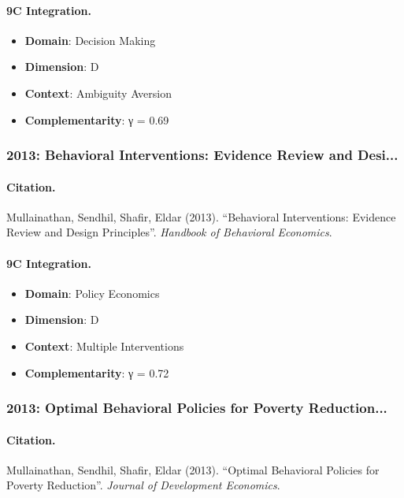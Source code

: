 \paragraph{9C Integration.}
\begin{itemize}[nosep]
  \item \textbf{Domain}: Decision Making
  \item \textbf{Dimension}: D
  \item \textbf{Context}: Ambiguity Aversion
  \item \textbf{Complementarity}: γ = 0.69
\end{itemize}


\subsubsection{2013: Behavioral Interventions: Evidence Review and Desi...}

\paragraph{Citation.}
Mullainathan, Sendhil, Shafir, Eldar (2013). ``Behavioral Interventions: Evidence Review and Design Principles''. \textit{Handbook of Behavioral Economics}.

\paragraph{9C Integration.}
\begin{itemize}[nosep]
  \item \textbf{Domain}: Policy Economics
  \item \textbf{Dimension}: D
  \item \textbf{Context}: Multiple Interventions
  \item \textbf{Complementarity}: γ = 0.72
\end{itemize}


\subsubsection{2013: Optimal Behavioral Policies for Poverty Reduction...}

\paragraph{Citation.}
Mullainathan, Sendhil, Shafir, Eldar (2013). ``Optimal Behavioral Policies for Poverty Reduction''. \textit{Journal of Development Economics}.

